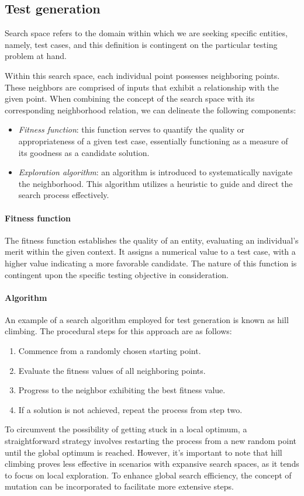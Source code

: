 \subsection{Test generation}
\begin{definition}
    Search space refers to the domain within which we are seeking specific entities, namely, test cases, and this definition is contingent on the particular testing problem at hand.
\end{definition}
Within this search space, each individual point possesses neighboring points. 
These neighbors are comprised of inputs that exhibit a relationship with the given point. 
When combining the concept of the search space with its corresponding neighborhood relation, we can delineate the following components:
\begin{itemize}
    \item \textit{Fitness function}: this function serves to quantify the quality or appropriateness of a given test case, essentially functioning as a measure of its goodness as a candidate solution.
    \item \textit{Exploration algorithm}: an algorithm is introduced to systematically navigate the neighborhood. 
        This algorithm utilizes a heuristic to guide and direct the search process effectively.
\end{itemize}

\paragraph*{Fitness function}
The fitness function establishes the quality of an entity, evaluating an individual's merit within the given context.
It assigns a numerical value to a test case, with a higher value indicating a more favorable candidate. 
The nature of this function is contingent upon the specific testing objective in consideration.

\paragraph*{Algorithm}
An example of a search algorithm employed for test generation is known as hill climbing.
The procedural steps for this approach are as follows:
\begin{enumerate}
    \item Commence from a randomly chosen starting point.
    \item Evaluate the fitness values of all neighboring points.
    \item Progress to the neighbor exhibiting the best fitness value.
    \item If a solution is not achieved, repeat the process from step two.
\end{enumerate}
To circumvent the possibility of getting stuck in a local optimum, a straightforward strategy involves restarting the process from a new random point until the global optimum is reached.
However, it's important to note that hill climbing proves less effective in scenarios with expansive search spaces, as it tends to focus on local exploration.
To enhance global search efficiency, the concept of mutation can be incorporated to facilitate more extensive steps.

